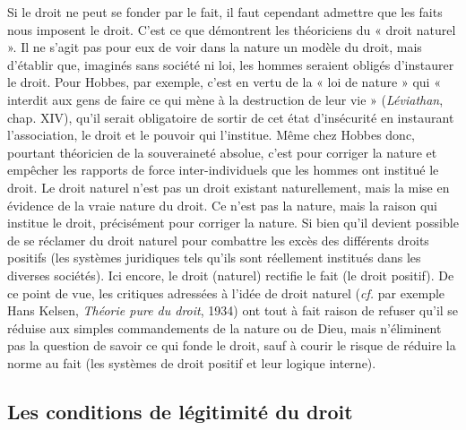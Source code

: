 Si le droit ne peut se fonder par le fait,
il faut cependant admettre que les faits
nous imposent le droit. C'est ce que
démontrent les théoriciens du « droit
naturel ». Il ne s'agit pas pour eux de
voir dans la nature un modèle du droit,
mais d'établir que, imaginés sans société
ni loi, les hommes seraient obligés
d'instaurer le droit. Pour Hobbes, par
exemple, c'est en vertu de la « loi de
nature » qui « interdit aux gens de faire
ce qui mène à la destruction de leur vie »
({\it Léviathan}, chap. XIV), qu'il serait obligatoire de sortir de cet état d'insécurité
en instaurant l'association, le droit et le
pouvoir qui l'institue. Même chez
Hobbes donc, pourtant théoricien de la
souveraineté absolue, c’est pour corriger
la nature et empêcher les rapports de
force inter-individuels que les hommes
ont institué le droit. Le droit naturel n’est
pas un droit existant naturellement, mais
la mise en évidence de la vraie nature
du droit. Ce n'est pas la nature, mais la
raison qui institue le droit, précisément
pour corriger la nature. Si bien qu'il
devient possible de se réclamer du droit
naturel pour combattre les excès des différents
%
 droits positifs (les systèmes juridiques tels qu'ils sont réellement institués dans les diverses sociétés). Ici
encore, le droit (naturel) rectifie le fait
(le droit positif). De ce point de vue, les
critiques adressées à l’idée de droit naturel
 ({\it cf.} par exemple Hans Kelsen, {\it Théorie pure du droit}, 1934) ont tout à fait
raison de refuser qu'il se réduise aux
simples commandements de la nature
ou de Dieu, mais n'éliminent pas la
question de savoir ce qui fonde le droit,
sauf à courir le risque de réduire la
norme au fait (les systèmes de droit
positif et leur logique interne).

\subsection{Les conditions de légitimité du droit}

